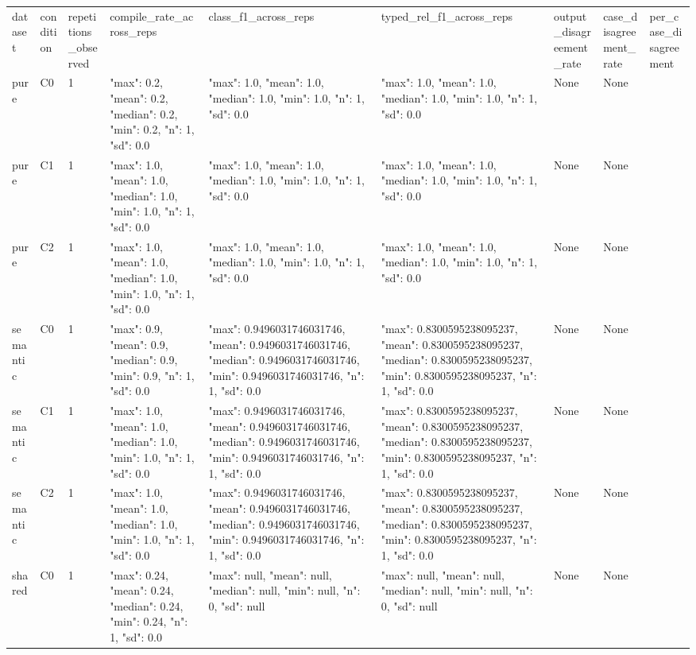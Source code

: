 \begin{tabular}{lllllllll}
dataset & condition & repetitions\_observed & compile\_rate\_across\_reps & class\_f1\_across\_reps & typed\_rel\_f1\_across\_reps & output\_disagreement\_rate & case\_disagreement\_rate & per\_case\_disagreement \\
pure & C0 & 1 & {"max": 0.2, "mean": 0.2, "median": 0.2, "min": 0.2, "n": 1, "sd": 0.0} & {"max": 1.0, "mean": 1.0, "median": 1.0, "min": 1.0, "n": 1, "sd": 0.0} & {"max": 1.0, "mean": 1.0, "median": 1.0, "min": 1.0, "n": 1, "sd": 0.0} & None & None & {} \\
pure & C1 & 1 & {"max": 1.0, "mean": 1.0, "median": 1.0, "min": 1.0, "n": 1, "sd": 0.0} & {"max": 1.0, "mean": 1.0, "median": 1.0, "min": 1.0, "n": 1, "sd": 0.0} & {"max": 1.0, "mean": 1.0, "median": 1.0, "min": 1.0, "n": 1, "sd": 0.0} & None & None & {} \\
pure & C2 & 1 & {"max": 1.0, "mean": 1.0, "median": 1.0, "min": 1.0, "n": 1, "sd": 0.0} & {"max": 1.0, "mean": 1.0, "median": 1.0, "min": 1.0, "n": 1, "sd": 0.0} & {"max": 1.0, "mean": 1.0, "median": 1.0, "min": 1.0, "n": 1, "sd": 0.0} & None & None & {} \\
semantic & C0 & 1 & {"max": 0.9, "mean": 0.9, "median": 0.9, "min": 0.9, "n": 1, "sd": 0.0} & {"max": 0.9496031746031746, "mean": 0.9496031746031746, "median": 0.9496031746031746, "min": 0.9496031746031746, "n": 1, "sd": 0.0} & {"max": 0.8300595238095237, "mean": 0.8300595238095237, "median": 0.8300595238095237, "min": 0.8300595238095237, "n": 1, "sd": 0.0} & None & None & {} \\
semantic & C1 & 1 & {"max": 1.0, "mean": 1.0, "median": 1.0, "min": 1.0, "n": 1, "sd": 0.0} & {"max": 0.9496031746031746, "mean": 0.9496031746031746, "median": 0.9496031746031746, "min": 0.9496031746031746, "n": 1, "sd": 0.0} & {"max": 0.8300595238095237, "mean": 0.8300595238095237, "median": 0.8300595238095237, "min": 0.8300595238095237, "n": 1, "sd": 0.0} & None & None & {} \\
semantic & C2 & 1 & {"max": 1.0, "mean": 1.0, "median": 1.0, "min": 1.0, "n": 1, "sd": 0.0} & {"max": 0.9496031746031746, "mean": 0.9496031746031746, "median": 0.9496031746031746, "min": 0.9496031746031746, "n": 1, "sd": 0.0} & {"max": 0.8300595238095237, "mean": 0.8300595238095237, "median": 0.8300595238095237, "min": 0.8300595238095237, "n": 1, "sd": 0.0} & None & None & {} \\
shared & C0 & 1 & {"max": 0.24, "mean": 0.24, "median": 0.24, "min": 0.24, "n": 1, "sd": 0.0} & {"max": null, "mean": null, "median": null, "min": null, "n": 0, "sd": null} & {"max": null, "mean": null, "median": null, "min": null, "n": 0, "sd": null} & None & None & {} \\

\end{tabular}
